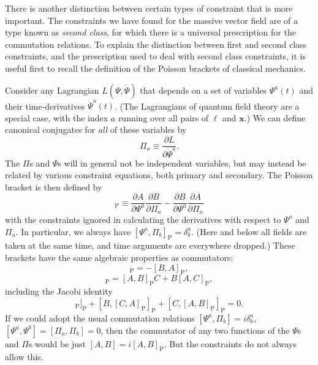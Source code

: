 There is another distinction between certain types of constraint that is more
important. The constraints we have found for the massive vector field are of
a type known as \emph{second class}, for which there is a universal
prescription for the commutation relations. To explain the distinction
between first and second class constraints, and the prescription used to deal
with second class constraints, it is useful first to recall the definition of
the Poisson brackets of classical mechanics.

Consider any Lagrangian $L(\Psi,\dot\Psi)$ that depends on a set of variables
$\Psi^a(t)$ and their time-derivatives $\dot\Psi^a(t)$. (The Lagrangians of
quantum field theory are a special case, with the index $a$ running over all
pairs of $\ell$ and $\mathbf x$.) We can define canonical conjugates for
\emph{all} of these variables by
\begin{equation}
\Pi_a\equiv\frac{\partial L}{\partial\dot\Psi^a}.
\tag{7.6.6}\label{eq:7.6.6}
\end{equation}
The $\Pi$s and $\Psi$s will in general not be independent variables, but may
instead be related by various constraint equations, both primary and
secondary. The Poisson bracket is then defined by
\begin{equation}
[A,B]_{\mathrm P}\equiv
\frac{\partial A}{\partial\Psi^a}\frac{\partial B}{\partial\Pi_a}
-\frac{\partial B}{\partial\Psi^a}\frac{\partial A}{\partial\Pi_a}
\tag{7.6.7}\label{eq:7.6.7}
\end{equation}
with the constraints ignored in calculating the derivatives with respect to
$\Psi^a$ and $\Pi_a$. In particular, we always have
$[\Psi^a,\Pi_b]_{\mathrm P}=\delta^a_b$. (Here and below all fields are taken
at the same time, and time arguments are everywhere dropped.) These brackets
have the same algebraic properties as commutators:
\begin{equation}
[A,B]_{\mathrm P}=-[B,A]_{\mathrm P},
\tag{7.6.8}\label{eq:7.6.8}
\end{equation}
\begin{equation}
[A,BC]_{\mathrm P}=[A,B]_{\mathrm P}C+B[A,C]_{\mathrm P},
\tag{7.6.9}\label{eq:7.6.9}
\end{equation}
including the Jacobi identity
\begin{equation}
[A,[B,C]_{\mathrm P}]_{\mathrm P}
+[B,[C,A]_{\mathrm P}]_{\mathrm P}
+[C,[A,B]_{\mathrm P}]_{\mathrm P}=0.
\tag{7.6.10}\label{eq:7.6.10}
\end{equation}
If we could adopt the usual commutation relations
$[\Psi^a,\Pi_b]=i\delta^a_b$, $[\Psi^a,\Psi^b]=[\Pi_a,\Pi_b]=0$, then the
commutator of any two functions of the $\Psi$s and $\Pi$s would be just
$[A,B]=i[A,B]_{\mathrm P}$. But the constraints do not always allow this.

